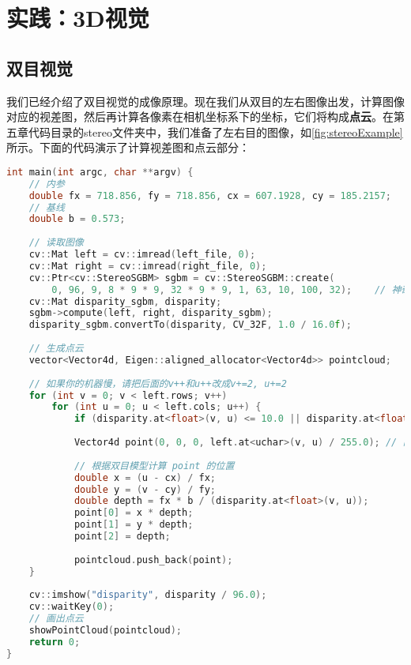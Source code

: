 \section{实践：3D视觉}
\subsection{双目视觉}
我们已经介绍了双目视觉的成像原理。现在我们从双目的左右图像出发，计算图像对应的视差图，然后再计算各像素在相机坐标系下的坐标，它们将构成\textbf{点云}。在第五章代码目录的stereo文件夹中，我们准备了左右目的图像，如\autoref{fig:stereoExample}所示。下面的代码演示了计算视差图和点云部分：
\begin{lstlisting}[language=C++,caption=slambook/ch5/stereoVision/stereoVision.cpp（部分）]
int main(int argc, char **argv) {
    // 内参
    double fx = 718.856, fy = 718.856, cx = 607.1928, cy = 185.2157;
    // 基线
    double b = 0.573;
    
    // 读取图像
    cv::Mat left = cv::imread(left_file, 0);
    cv::Mat right = cv::imread(right_file, 0);
    cv::Ptr<cv::StereoSGBM> sgbm = cv::StereoSGBM::create(
        0, 96, 9, 8 * 9 * 9, 32 * 9 * 9, 1, 63, 10, 100, 32);    // 神奇的参数
    cv::Mat disparity_sgbm, disparity;
    sgbm->compute(left, right, disparity_sgbm);
    disparity_sgbm.convertTo(disparity, CV_32F, 1.0 / 16.0f);
    
    // 生成点云
    vector<Vector4d, Eigen::aligned_allocator<Vector4d>> pointcloud;
    
    // 如果你的机器慢，请把后面的v++和u++改成v+=2, u+=2
    for (int v = 0; v < left.rows; v++)
        for (int u = 0; u < left.cols; u++) {
            if (disparity.at<float>(v, u) <= 10.0 || disparity.at<float>(v, u) >= 96.0) continue;
            
            Vector4d point(0, 0, 0, left.at<uchar>(v, u) / 255.0); // 前三维为xyz,第四维为颜色
            
            // 根据双目模型计算 point 的位置
            double x = (u - cx) / fx;
            double y = (v - cy) / fy;
            double depth = fx * b / (disparity.at<float>(v, u));
            point[0] = x * depth;
            point[1] = y * depth;
            point[2] = depth;
            
            pointcloud.push_back(point);
    }
    
    cv::imshow("disparity", disparity / 96.0);
    cv::waitKey(0);
    // 画出点云
    showPointCloud(pointcloud);
    return 0;
}
\end{lstlisting}

